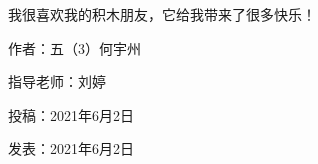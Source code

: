 我很喜欢我的积木朋友，它给我带来了很多快乐！





\vspace{10pt}



作者：五（3）何宇州



指导老师：刘婷



投稿：2021年6月2日



发表：2021年6月2日








                



\vspace{10pt}

\hline




